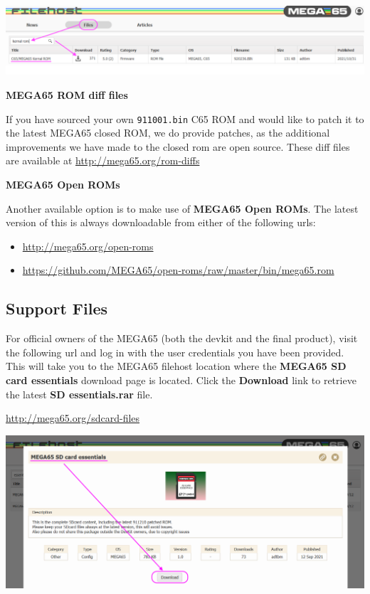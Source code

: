 \includegraphics[width=\linewidth]{images/latest_closed_rom.png}

\textbf{MEGA65 ROM diff files}

If you have sourced your own {\tt 911001.bin} C65 ROM and would like to patch it to the latest MEGA65 closed ROM,
we do provide patches, as the additional improvements we have made to the closed rom are open source.
These diff files are available at \url{http://mega65.org/rom-diffs}

\textbf{MEGA65 Open ROMs}

Another available option is to make use of \textbf{MEGA65 Open ROMs}. The latest version of this is always downloadable from either of the following urls:

\begin{itemize}
  \item \url{http://mega65.org/open-roms}
  \item \url{https://github.com/MEGA65/open-roms/raw/master/bin/mega65.rom}
\end{itemize}


\subsection{Support Files}

For official owners of the MEGA65 (both the devkit and the final product), visit the following url and log in with
the user credentials you have been provided. This will take you to the MEGA65 filehost location where the \textbf{MEGA65 SD card essentials} download page is located. Click the \textbf{Download} link to retrieve the latest \textbf{SD essentials.rar} file.

\url{http://mega65.org/sdcard-files}

\includegraphics[width=\linewidth]{images/latest_support_files_with_closedrom.png}

